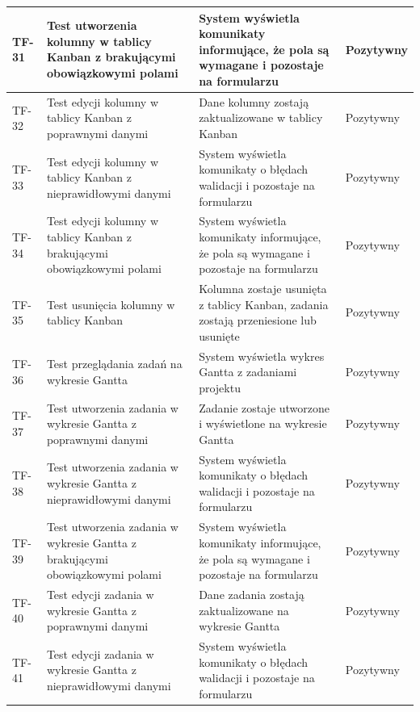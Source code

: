 \begin{longtable}{|p{2cm}|p{6cm}|p{5cm}|p{2.5cm}|}
TF-31 & Test utworzenia kolumny w tablicy Kanban z brakującymi obowiązkowymi polami & System wyświetla komunikaty informujące, że pola są wymagane i pozostaje na formularzu & Pozytywny \\ \hline

TF-32 & Test edycji kolumny w tablicy Kanban z poprawnymi danymi & Dane kolumny zostają zaktualizowane w tablicy Kanban & Pozytywny \\ \hline

TF-33 & Test edycji kolumny w tablicy Kanban z nieprawidłowymi danymi & System wyświetla komunikaty o błędach walidacji i pozostaje na formularzu & Pozytywny \\ \hline

TF-34 & Test edycji kolumny w tablicy Kanban z brakującymi obowiązkowymi polami & System wyświetla komunikaty informujące, że pola są wymagane i pozostaje na formularzu & Pozytywny \\ \hline

TF-35 & Test usunięcia kolumny w tablicy Kanban & Kolumna zostaje usunięta z tablicy Kanban, zadania zostają przeniesione lub usunięte & Pozytywny \\ \hline

TF-36 & Test przeglądania zadań na wykresie Gantta & System wyświetla wykres Gantta z zadaniami projektu & Pozytywny \\ \hline

TF-37 & Test utworzenia zadania w wykresie Gantta z poprawnymi danymi & Zadanie zostaje utworzone i wyświetlone na wykresie Gantta & Pozytywny \\ \hline

TF-38 & Test utworzenia zadania w wykresie Gantta z nieprawidłowymi danymi & System wyświetla komunikaty o błędach walidacji i pozostaje na formularzu & Pozytywny \\ \hline

TF-39 & Test utworzenia zadania w wykresie Gantta z brakującymi obowiązkowymi polami & System wyświetla komunikaty informujące, że pola są wymagane i pozostaje na formularzu & Pozytywny \\ \hline

TF-40 & Test edycji zadania w wykresie Gantta z poprawnymi danymi & Dane zadania zostają zaktualizowane na wykresie Gantta & Pozytywny \\ \hline

TF-41 & Test edycji zadania w wykresie Gantta z nieprawidłowymi danymi & System wyświetla komunikaty o błędach walidacji i pozostaje na formularzu & Pozytywny \\ \hline


\end{longtable}
